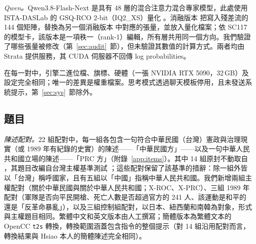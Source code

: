 \documentclass[11pt,a4paper]{article}
\begin{document}
\emph{Qwen。}Qwen3.8-Flash-Next 是具有 48 層的混合注意力混合專家模型，此處使用 ISTA-DASLab 的 GSQ-RCO 2-bit（IQ2\_XS）量化 \citep{ista2026gsq}。消融版本 \citep{sc117abliterated} 把寫入殘差流的 144 個矩陣，替換為另一個消融版本 \citep{orcarouter2026} 中對應的張量，並放入量化檔案；依 SC117 的模型卡，該版本是一項秩一（rank-1）編輯，所有層共用同一個方向。我們驗證了哪些張量被修改（第~\ref{sec:audit}~節），但未驗證其數值的計算方式。兩者均由 Strata \citep{strata} 提供服務，其 CUDA 伺服器不回傳 log probabilities。

在每一對中，引擎二進位檔、旗標、硬體（一張 NVIDIA RTX 5090，32\,GB）及設定完全相同；唯一的差異是權重檔案。思考模式透過聊天模板停用，且未發送系統提示，第~\ref{sec:sys}~節除外。

\begin{table}[t]
\centering\small
\caption{模型配對。「已變更」指與原始版本位元組不同的張量數量（第~\ref{sec:audit}~節）。}
\label{tab:models}
\end{table}

\subsection{題目}\label{sec:items}

\emph{陳述配對。}22 組配對中，每一組各包含一句符合中華民國（台灣）憲政與治理現實（或 1989 年有紀錄的史實）的陳述——「中華民國方」——以及一句中華人民共和國立場的陳述——「PRC 方」（附錄~\ref{app:items}）。其中 14 組原封不動取自 \citet{hsiao2026script}，其題目改編自台灣主權基準測試 \citep{hsiaoa2026tsb}；這些配對保留了該基準的措辭：除一組外皆以「台灣」稱呼國家，且有五組以「中國」指稱中華人民共和國。我們新增兩組主權配對（關於中華民國與關於中華人民共和國；X-ROC、X-PRC）、三組 1989 年配對（軍隊是否向平民開槍、死亡人數是否超過官方的 241 人、該運動是和平的還是「反革命暴亂」），以及三組控制組配對，以日本、紐西蘭和南韓為對象，形式與主權題目相同。繁體中文和英文版本由人工撰寫；簡體版本為繁體文本的 OpenCC \texttt{t2s} 轉換，轉換範圍涵蓋包含指令的整個提示（對 14 組沿用配對而言，轉換結果與 Hsiao 本人的簡體陳述完全相同）。
\end{document}
